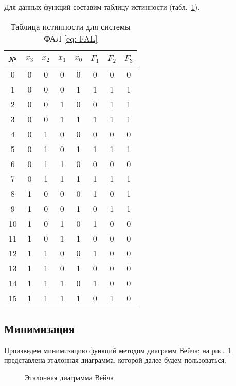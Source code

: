 Для данных функций составим таблицу истинности (табл.~\ref{tab: true-false}).
\begin{table}[h]
	\centering
	\caption{Таблица истинности для системы ФАЛ \eqref{eq: FAL}} \label{tab: true-false}
	\begin{tabular}{|c||c|c|c|c||c|c|c|}
		\hline
		№ & $x_3$ & $x_2$ & $x_1$ & $x_0$ & $F_1$ & $F_2$ & $F_3$ \\
		\hline
		0 & 0 & 0 & 0 & 0 & 0 & 0 & 0 \\
		\hline
		1 & 0 & 0 & 0 & 1 & 1 & 1 & 1 \\
		\hline
		2 & 0 & 0 & 1 & 0 & 0 & 1 & 1 \\
		\hline
		3 & 0 & 0 & 1 & 1 & 1 & 1 & 1 \\
		\hline
		4 & 0 & 1 & 0 & 0 & 0 & 0 & 0 \\
		\hline
		5 & 0 & 1 & 0 & 1 & 1 & 1 & 1 \\
		\hline
		6 & 0 & 1 & 1 & 0 & 0 & 0 & 0 \\
		\hline
		7 & 0 & 1 & 1 & 1 & 1 & 1 & 1 \\
		\hline
		8 & 1 & 0 & 0 & 0 & 1 & 0 & 1 \\
		\hline
		9 & 1 & 0 & 0 & 1 & 0 & 1 & 1 \\
		\hline
		10 & 1 & 0 & 1 & 0 & 1 & 0 & 0 \\
		\hline
		11 & 1 & 0 & 1 & 1 & 0 & 0 & 0 \\
		\hline
		12 & 1 & 1 & 0 & 0 & 1 & 0 & 0 \\
		\hline
		13 & 1 & 1 & 0 & 1 & 0 & 0 & 0 \\
		\hline
		14 & 1 & 1 & 1 & 0 & 1 & 0 & 0 \\
		\hline
		15 & 1 & 1 & 1 & 1 & 0 & 1 & 0 \\
		\hline
	\end{tabular}
\end{table}

\subsection{Минимизация}
Произведем минимизацию функций методом диаграмм Вейча; на рис.~\ref{fig: diagram_sample} представлена эталонная диаграмма, которой далее будем пользоваться.
\begin{figure}[h]
	\centering
{}
\caption{Эталонная диаграмма Вейча} \label{fig: diagram_sample}
\end{figure}

